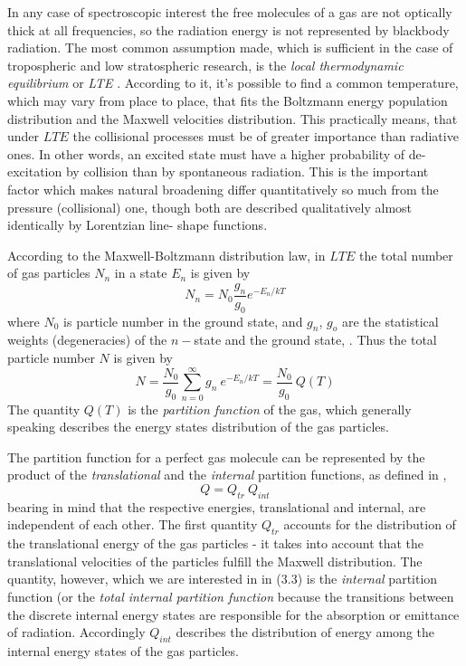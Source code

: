 In any case of spectroscopic interest the free molecules of a gas are
not optically thick at all frequencies, so the radiation energy is not
represented by blackbody radiation. The most common assumption made,
which is sufficient in the case of tropospheric and low stratospheric
research, is the {\textit{local thermodynamic equilibrium}\nocorr} or
{\textit{LTE }\nocorr}. According to it, it's possible to find a common temperature,
which may vary from place to place, that fits the Boltzmann energy
population distribution and the Maxwell velocities distribution.
This practically means, that under $LTE$ the collisional processes
must be of greater importance than radiative ones. In other words,
an excited state must have a higher probability of de-excitation by
collision than by spontaneous radiation. This is the important
factor which makes natural broadening differ quantitatively so much
from the pressure (collisional) one, though both are described
qualitatively almost identically by Lorentzian line- shape
functions.

According to the Maxwell-Boltzmann distribution law, in $LTE$ the total number
of gas particles $N_n$  in a state $E_n$ is given by 
\begin{equation}\label{maxwell_distribution}
 N_n=N_0\frac{g_n}{g_0}e^{-E_n/kT}
\end{equation}
where $N_0$ is particle number in the ground state, and $g_n$, $g_o$
are the statistical weights (degeneracies) of the $n-$state and the
ground state, \citet{gordyandcook:70}. Thus the total particle number $N$ is given by
\begin{equation}\label{total_part_number}
 N=\frac{N_0}{g_0}\sum_{n=0}^\infty g_n~e^{-E_n/kT}=\frac{N_0}{g_0}~Q(T)
\end{equation}
The quantity $Q(T)$ is the {\it{partition function}\nocorr} of the
gas, which generally speaking describes the energy states distribution
of the gas particles. 

The partition function for a perfect gas molecule can be represented
by the product of the {\it{translational}\nocorr} and the
{\it{internal}\nocorr} partition functions, as defined in \citet{herzberg:45},
\begin{equation}\label{partition_f_general}
 Q  =  Q_{tr}~Q_{int}
\end{equation}
bearing in mind that the respective energies, translational and
internal, are independent of each other. The first quantity $Q_{tr}$ accounts
for the distribution of the translational energy of the gas particles
- it takes into account that the translational velocities of the
particles fulfill the Maxwell distribution. The quantity, however,
which we are interested in in (3.3) is the {\it{internal}\nocorr}
partition function (or the {\it{total internal partition  function}\nocorr}
 because the transitions between the discrete
internal energy states are responsible for the absorption or emittance
of radiation. Accordingly $Q_{int}$ describes the
distribution of energy among the internal energy states of the gas
particles.

